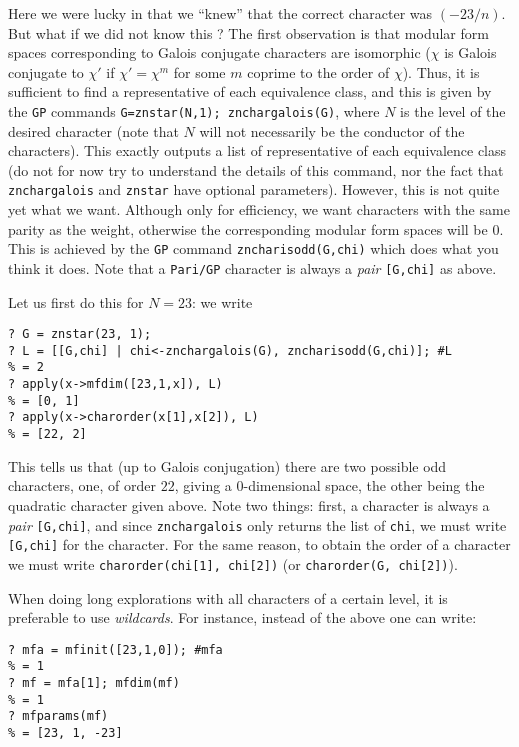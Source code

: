 \documentclass[11pt]{article}
\def\kbd#1{{\tt #1}}
\begin{document}
Here we were lucky in that we ``knew'' that the correct character was
$(-23/n)$. But what if we did not know this ? The first observation is
that modular form spaces corresponding to Galois conjugate characters
are isomorphic ($\chi$ is Galois conjugate to $\chi'$ if $\chi'=\chi^m$
for some $m$ coprime to the order of $\chi$). Thus, it is sufficient
to find a representative of each equivalence class, and this is given by
the \kbd{GP} commands \kbd{G=znstar(N,1); znchargalois(G)}, where $N$ is the
level of the desired character (note that $N$ will not necessarily be
the conductor of the characters). This exactly outputs a list of representative
of each equivalence class (do not for now try to understand the details of
this command, nor the fact that \kbd{znchargalois} and \kbd{znstar} have
optional parameters). However, this is not quite yet what we want.
Although only for efficiency, we want characters with the same parity
as the weight, otherwise the corresponding modular form spaces will be $0$.
This is achieved by the \kbd{GP} command \kbd{zncharisodd(G,chi)} which
does what you think it does. Note that a \kbd{Pari/GP} character is always
a \emph{pair} \kbd{[G,chi]} as above.

Let us first do this for $N=23$: we write

\begin{verbatim}
? G = znstar(23, 1);
? L = [[G,chi] | chi<-znchargalois(G), zncharisodd(G,chi)]; #L
% = 2
? apply(x->mfdim([23,1,x]), L)
% = [0, 1]
? apply(x->charorder(x[1],x[2]), L)
% = [22, 2]
\end{verbatim}

This tells us that (up to Galois conjugation) there are two possible odd
characters, one, of order $22$, giving a $0$-dimensional space, the other
being the quadratic character given above. Note two things: first, a character
is always a \emph{pair} \kbd{[G,chi]}, and since \kbd{znchargalois} only
returns the list of \kbd{chi}, we must write \kbd{[G,chi]} for the character.
For the same reason, to obtain the order of a character we must write
\kbd{charorder(chi[1], chi[2])} (or \kbd{charorder(G, chi[2])}).

When doing long explorations with all characters of a certain level, it
is preferable to use \emph{wildcards}. For instance, instead of the above
one can write:

\begin{verbatim}
? mfa = mfinit([23,1,0]); #mfa
% = 1
? mf = mfa[1]; mfdim(mf)
% = 1
? mfparams(mf)
% = [23, 1, -23]
\end{verbatim}
\end{document}
